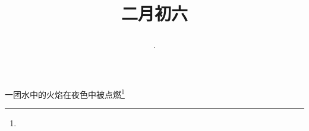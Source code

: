 \title{\date[d=15,m=3,y=2024][year:cn-y,年,month:cn,day:cn,日,·,weekday]·二月初六 }
一团水中的火焰在夜色中被点燃\footnote{ }

